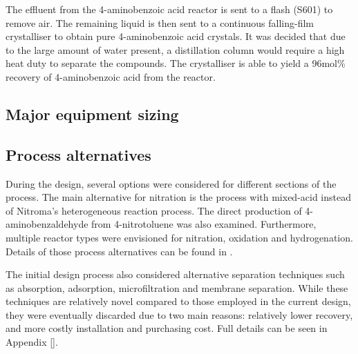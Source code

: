 The effluent from the 4-aminobenzoic acid reactor is sent to a flash (S601) to remove air. The remaining liquid is then sent to a continuous falling-film crystalliser to obtain pure 4-aminobenzoic acid crystals. It was decided that due to the large amount of water present, a distillation column would require a high heat duty to separate the compounds. The crystalliser is able to yield a 96mol\% recovery of 4-aminobenzoic acid from the reactor.

\subsection{Major equipment sizing}


\subsection{Process alternatives}
During the design, several options were considered for different sections of the process. The main alternative for nitration is the process with mixed-acid instead of Nitroma's heterogeneous reaction process. The direct production of 4-aminobenzaldehyde from 4-nitrotoluene was also examined. Furthermore, multiple reactor types were envisioned for nitration, oxidation and hydrogenation. Details of those process alternatives can be found in .

The initial design process also considered alternative separation techniques such as absorption, adsorption, microfiltration and membrane separation. While these techniques are relatively novel compared to those employed in the current design, they were eventually discarded due to two main reasons: relatively lower recovery, and more costly installation and purchasing cost. Full details can be seen in Appendix [].



